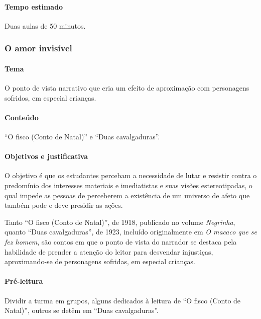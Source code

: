 \documentclass[11pt]{extarticle}
\begin{document}
\paragraph{Tempo estimado} Duas aulas de 50 minutos.

\subsubsection{O amor invisível}

\paragraph{Tema} O ponto de vista narrativo que cria um efeito de
aproximação com personagens sofridos, em especial crianças.

\paragraph{Conteúdo} ``O fisco (Conto de Natal)'' e ``Duas cavalgaduras''.

\paragraph{Objetivos e justificativa}
O objetivo é que os estudantes percebam a necessidade de lutar e
resistir contra o predomínio dos interesses materiais e imediatistas e
suas visões estereotipadas, o qual impede as pessoas de perceberem a
existência de um universo de afeto que também pode e deve presidir as
ações.

Tanto ``O fisco (Conto de Natal)'', de 1918, publicado no volume
\emph{Negrinha}, quanto ``Duas cavalgaduras'', de 1923, incluído
originalmente em \emph{O macaco que se fez homem}, são contos em que o
ponto de vista do narrador se destaca pela habilidade de prender a
atenção do leitor para desvendar injustiças, aproximando-se de
personagens sofridas, em especial crianças.


\asterisc\paragraph{Pré-leitura}

Dividir a turma em grupos, alguns dedicados à leitura de ``O fisco
(Conto de Natal)'', outros se detêm em ``Duas cavalgaduras''.
\end{document}
